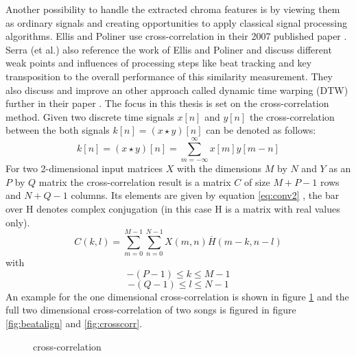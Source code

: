 Another possibility to handle the extracted chroma features is by viewing them as ordinary signals and creating opportunities to apply classical signal processing algorithms. Ellis and Poliner use cross-correlation in their 2007 published paper \cite{chroma3}. Serra (et al.) also reference the work of Ellis and Poliner and discuss different weak points and influences of processing steps like beat tracking and key transposition to the overall performance of this similarity measurement. 
They also discuss and improve an other approach called dynamic time warping (DTW) further in their paper \cite{chroma2}. The focus in this thesis is set on the cross-correlation method. 
Given two discrete time signals $x[n]$ and $y[n]$ the cross-correlation between the both signals $k[n] = (x \star y)[n]$ can be denoted as follows:
\begin{equation} \label{eq:conv1}
k[n] = (x \star y)[n] = \sum_{m = -\infty}^{\infty}{x[m] y[m - n]} 
\end{equation}
For two 2-dimensional input matrices $X$ with the dimensions $M$ by $N$ and $Y$ as an $P$ by $Q$ matrix the cross-correlation result is a matrix $C$ of size $M + P - 1$ rows and $N + Q - 1$ columns. Its elements are given by equation \ref{eq:conv2} \cite{mathcorr}, the bar over H denotes complex conjugation (in this case H is a matrix with real values only).
\begin{equation} \label{eq:conv2}
C(k, l) = \sum_{m = 0}^{M - 1}{\sum_{n = 0}^{N - 1}{X(m, n)\overline{H}(m - k, n - l)}}
\end{equation}
with 
\begin{equation} \label{eq:conv3}
-(P - 1) \leq k \leq M - 1
\end{equation}
\begin{equation} \label{eq:conv4}
-(Q - 1) \leq l \leq N - 1
\end{equation}
An example for the one dimensional cross-correlation is shown in figure \ref{fig:corr1} and the full two dimensional cross-correlation of two songs is figured in figure \ref{fig:beatalign} and \ref{fig:crosscorr}.
\begin{figure}[htbp]
	\centering
	\caption{cross-correlation}
	\label{fig:corr1}
\end{figure}
